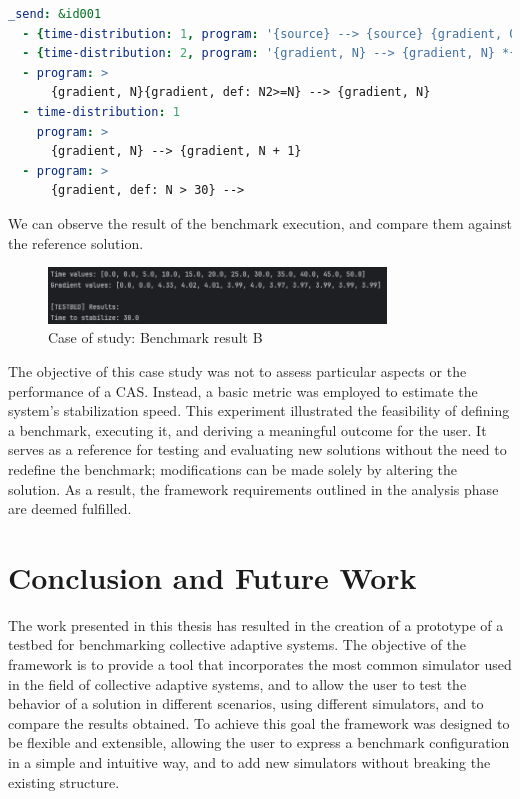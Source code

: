 \documentclass[12pt,a4paper,openright,twoside]{book}
\begin{document}
\begin{lstlisting}[language=yaml, caption={Case of study: benchmark configuration file}]
  _send: &id001
  - {time-distribution: 1, program: '{source} --> {source} {gradient, 0}'}
  - {time-distribution: 2, program: '{gradient, N} --> {gradient, N} *{gradient, N+#D}'}
  - program: >
      {gradient, N}{gradient, def: N2>=N} --> {gradient, N}
  - time-distribution: 1
    program: >
      {gradient, N} --> {gradient, N + 1}
  - program: >
      {gradient, def: N > 30} -->
\end{lstlisting}

We can observe the result of the benchmark execution, and compare them against the reference solution.

\begin{figure}[H]
  \centering
  \includegraphics[width=0.8\textwidth]{figures/result-B.png}
  \caption{Case of study: Benchmark result B}
\end{figure}

The objective of this case study was not to assess particular aspects or the performance of a CAS. 
Instead, a basic metric was employed to estimate the system's stabilization speed.
This experiment illustrated the feasibility of defining a benchmark, executing it, and deriving a meaningful outcome for the user. 
It serves as a reference for testing and evaluating new solutions without the need to redefine the benchmark; modifications can be made solely by altering the solution. 
As a result, the framework requirements outlined in the analysis phase are deemed fulfilled.

\chapter{Conclusion and Future Work}

The work presented in this thesis has resulted in the creation of a prototype of a testbed for benchmarking collective adaptive systems.
The objective of the framework is to provide a tool that incorporates the most common simulator used in the field of collective adaptive systems,
and to allow the user to test the behavior of a solution in different scenarios, using different simulators, and to compare the results obtained.
To achieve this goal the framework was designed to be flexible and extensible, allowing the user to express a benchmark configuration in a simple and intuitive way, and to add new simulators without breaking the existing structure.
\end{document}
